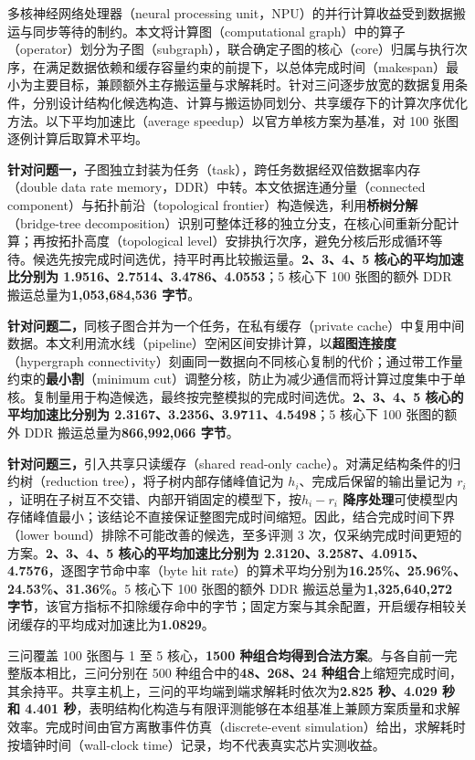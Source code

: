 
多核神经网络处理器（neural processing unit，NPU）的并行计算收益受到数据搬运与同步等待的制约。本文将计算图（computational graph）中的算子（operator）划分为子图（subgraph），联合确定子图的核心（core）归属与执行次序，在满足数据依赖和缓存容量约束的前提下，以总体完成时间（makespan）最小为主要目标，兼顾额外主存搬运量与求解耗时。针对三问逐步放宽的数据复用条件，分别设计结构化候选构造、计算与搬运协同划分、共享缓存下的计算次序优化方法。以下平均加速比（average speedup）以官方单核方案为基准，对 100 张图逐例计算后取算术平均。

\textbf{针对问题一，}子图独立封装为任务（task），跨任务数据经双倍数据率内存（double data rate memory，DDR）中转。本文依据连通分量（connected component）与拓扑前沿（topological frontier）构造候选，利用\textbf{桥树分解}（bridge-tree decomposition）识别可整体迁移的独立分支，在核心间重新分配计算；再按拓扑高度（topological level）安排执行次序，避免分核后形成循环等待。候选先按完成时间选优，持平时再比较搬运量。\textbf{2、3、4、5 核心的平均加速比分别为 1.9516、2.7514、3.4786、4.0553}；5 核心下 100 张图的额外 DDR 搬运总量为\textbf{1,053,684,536 字节}。

\textbf{针对问题二，}同核子图合并为一个任务，在私有缓存（private cache）中复用中间数据。本文利用流水线（pipeline）空闲区间安排计算，以\textbf{超图连接度}（hypergraph connectivity）刻画同一数据向不同核心复制的代价；通过带工作量约束的\textbf{最小割}（minimum cut）调整分核，防止为减少通信而将计算过度集中于单核。复制量用于构造候选，最终按完整模拟的完成时间选优。\textbf{2、3、4、5 核心的平均加速比分别为 2.3167、3.2356、3.9711、4.5498}；5 核心下 100 张图的额外 DDR 搬运总量为\textbf{866,992,066 字节}。

\textbf{针对问题三，}引入共享只读缓存（shared read-only cache）。对满足结构条件的归约树（reduction tree），将子树内部存储峰值记为 $h_i$、完成后保留的输出量记为 $r_i$，证明在子树互不交错、内部开销固定的模型下，按\textbf{$h_i-r_i$ 降序处理}可使模型内存储峰值最小；该结论不直接保证整图完成时间缩短。因此，结合完成时间下界（lower bound）排除不可能改善的候选，至多评测 3 次，仅采纳完成时间更短的方案。\textbf{2、3、4、5 核心的平均加速比分别为 2.3120、3.2587、4.0915、4.7576}，逐图字节命中率（byte hit rate）的算术平均分别为\textbf{16.25\%、25.96\%、24.53\%、31.36\%}。5 核心下 100 张图的额外 DDR 搬运总量为\textbf{1,325,640,272 字节}，该官方指标不扣除缓存命中的字节；固定方案与其余配置，开启缓存相较关闭缓存的平均成对加速比为\textbf{1.0829}。

三问覆盖 100 张图与 1 至 5 核心，\textbf{1500 种组合均得到合法方案}。与各自前一完整版本相比，三问分别在 500 种组合中的\textbf{48、268、24 种组合}上缩短完成时间，其余持平。共享主机上，三问的平均端到端求解耗时依次为\textbf{2.825 秒、4.029 秒和 4.401 秒}，表明结构化构造与有限评测能够在本组基准上兼顾方案质量和求解效率。完成时间由官方离散事件仿真（discrete-event simulation）给出，求解耗时按墙钟时间（wall-clock time）记录，均不代表真实芯片实测收益。
